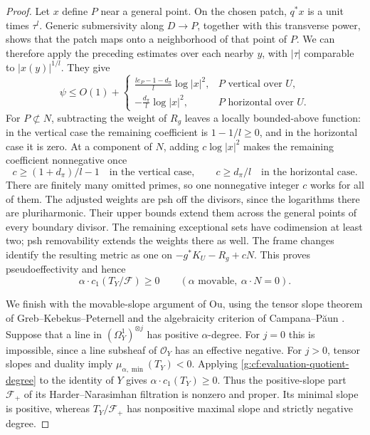 \begin{proof}
Let \(x\) define \(P\) near a general point.  On the chosen patch,
\(q^*x\) is a unit times \(\tau^l\).  Generic submersivity along
\(D\to P\), together with this transverse power, shows that the
patch maps onto a neighborhood of that point of \(P\).  We can
therefore apply the preceding estimates over each nearby \(y\),
with \(|\tau|\) comparable to \(|x(y)|^{1/l}\).  They give
\begin{equation}\label{g:cf:evaluation-exponents}
 \psi\leq O(1)+
 \begin{cases}
 \displaystyle\frac{le_P-1-d_\pi}{l}\log|x|^2,
     &P\text{ vertical over }U,\\[4pt]
 \displaystyle-\frac{d_\pi}{l}\log|x|^2,
     &P\text{ horizontal over }U.
 \end{cases}
\end{equation}
For \(P\not\subset N\), subtracting the weight of \(R_g\) leaves
a locally bounded-above function: in the vertical case the
remaining coefficient is \(1-1/l\geq0\), and in the horizontal
case it is zero.  At a component of \(N\), adding
\(c\log|x|^2\) makes the remaining coefficient nonnegative once
\[
 c\geq (1+d_\pi)/l-1\quad\text{in the vertical case},
 \qquad c\geq d_\pi/l\quad\text{in the horizontal case}.
\]
There are finitely many omitted primes, so one nonnegative integer
\(c\) works for all of them.  The adjusted weights are psh off the
divisors, since the logarithms there are pluriharmonic.  Their upper
bounds extend them across the general points of every boundary
divisor.  The remaining exceptional sets have codimension at least
two; psh removability extends the weights there as well.  The frame
changes identify the resulting metric as one on
\(-g^*K_U-R_g+cN\).  This proves pseudoeffectivity and hence
\begin{equation}\label{g:cf:evaluation-quotient-degree}
 \alpha\cdot c_1(T_Y/\mathcal F)\geq0
 \qquad(\alpha\text{ movable},\ \alpha\cdot N=0).
\end{equation}

We finish with the movable-slope argument of Ou, using the tensor
slope theorem of Greb--Kebekus--Peternell and the algebraicity
criterion of Campana--P\u{a}un
\cite{GKP2016,CampanaPaun2019,Ou2023,LMPTX2023}.
Suppose that a line in \((\Omega_Y^1)^{\otimes j}\) has positive
\(\alpha\)-degree.  For \(j=0\) this is impossible, since a line
subsheaf of \(\mathcal O_Y\) has an effective negative.  For
\(j>0\), tensor slopes and duality imply
\(\mu_{\alpha,\min}(T_Y)<0\).  Applying
\eqref{g:cf:evaluation-quotient-degree} to the identity of \(Y\)
gives \(\alpha\cdot c_1(T_Y)\geq0\).  Thus the positive-slope
part \(\mathcal F_+\) of its Harder--Narasimhan filtration is
nonzero and proper.  Its minimal slope is positive, whereas
\(T_Y/\mathcal F_+\) has nonpositive maximal slope and strictly
negative degree.


\end{proof}
